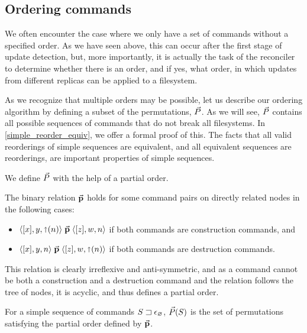 
\subsection{Ordering commands}

We often encounter the case where we only have a set of commands without a specified order.
As we have seen above, this can occur after the first stage of update detection,
but, more importantly,
it is actually the task of the reconciler to determine whether there is an order,
and if yes, what order,
in which updates from different replicas can be applied to a filesystem.

As we recognize that multiple orders may be possible,
let us describe our ordering algorithm by
defining a subset of the permutations, $\ordersetsign$.
As we will see, $\ordersetsign$ contains all possible
sequences of commands that do not break all filesystems.
In \cref{simple_reorder_equiv}, we offer a formal proof of this.
The facts that all valid reorderings of simple sequences are equivalent,
and all equivalent sequences are reorderings, are important 
properties of simple sequences.

We define $\ordersetsign$ with the help of a partial order.
\begin{mydef}[$\orderrel$]
The binary relation $\orderrel$ holds for some command pairs
on directly related nodes in the following cases:
\begin{itemize}
\item $\langle{[x],y,\mathord{\shortuparrow}({n})}\rangle \mathrel{\vec{\mathbf{p}}} \langle{[z],w,n}\rangle$ if both commands are construction commands, and
\item $\langle{[x],y,n}\rangle \mathrel{\vec{\mathbf{p}}} \langle{[z],w,\mathord{\shortuparrow}({n})}\rangle$ if both commands are destruction commands.
\end{itemize}
\end{mydef}
This relation is clearly irreflexive and anti-symmetric,
and as a command cannot be both a construction and a destruction command and
the relation follows the tree of nodes, it is acyclic,
and thus defines a partial order.

\begin{mydef}[$\ordersetsign$]
For a simple sequence of commands ${S}\sqsupset\epsilon_\varnothing$,
$\vec{P}({S})$ is the set of permutations satisfying the partial order defined by $\orderrel$.
\end{mydef}

